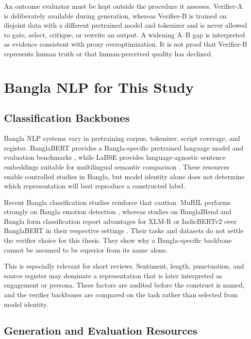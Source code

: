 An outcome evaluator must be kept outside the procedure it assesses. Verifier-A is deliberately available during generation, whereas Verifier-B is trained on disjoint data with a different pretrained model and tokenizer and is never allowed to gate, select, critique, or rewrite an output. A widening A–B gap is interpreted as evidence consistent with proxy overoptimization. It is not proof that Verifier-B represents human truth or that human-perceived quality has declined.

\section{Bangla NLP for This Study}
\label{sec:bangla-nlp}

\subsection{Classification Backbones}

Bangla NLP systems vary in pretraining corpus, tokenizer, script coverage, and register. BanglaBERT provides a Bangla-specific pretrained language model and evaluation benchmarks \cite{b2}, while LaBSE provides language-agnostic sentence embeddings suitable for multilingual semantic comparison \cite{b3}. These resources enable controlled studies in Bangla, but model identity alone does not determine which representation will best reproduce a constructed label.

Recent Bangla classification studies reinforce that caution. MuRIL performs strongly on Bangla emotion detection \cite{b26}, whereas studies on BanglaBlend and Bangla form classification report advantages for XLM-R or IndicBERTv2 over BanglaBERT in their respective settings \cite{b27,b28}. Their tasks and datasets do not settle the verifier choice for this thesis. They show why a Bangla-specific backbone cannot be assumed to be superior from its name alone.

This is especially relevant for short reviews. Sentiment, length, punctuation, and source register may dominate a representation that is later interpreted as engagement or persona. These factors are audited before the construct is named, and the verifier backbones are compared on the task rather than selected from model identity.

\subsection{Generation and Evaluation Resources}

